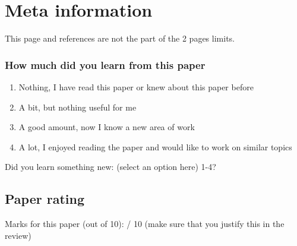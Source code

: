 \documentclass[sigconf,10pt, screen]{acmart}
\begin{document}
\section{Meta information}
This page and references are not the part of the 2 pages limits. 
\subsubsection{How much did you learn from this paper}
\begin{enumerate}
    \item Nothing, I have read this paper or knew about this paper before 
    \item A bit, but nothing useful for me
    \item A good amount, now I know a new area of work
    \item A lot, I enjoyed reading the paper and would like to work on similar topics
\end{enumerate}


Did you learn something new: (select an option here) 1-4?

\subsection{Paper rating}
Marks for this paper (out of 10): / 10 (make sure that you justify this in the review) 




\end{document}
